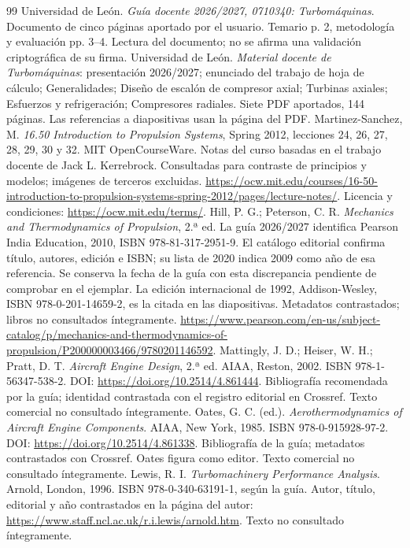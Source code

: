 \documentclass[10pt,openany]{book}
\begin{document}
\backmatter

\begin{thebibliography}{99}
 Universidad de León. \emph{Guía docente 2026/2027, 0710340: Turbomáquinas}. Documento de cinco páginas aportado por el usuario. Temario p. 2, metodología y evaluación pp. 3--4. Lectura del documento; no se afirma una validación criptográfica de su firma.
 Universidad de León. \emph{Material docente de Turbomáquinas}: presentación 2026/2027; enunciado del trabajo de hoja de cálculo; Generalidades; Diseño de escalón de compresor axial; Turbinas axiales; Esfuerzos y refrigeración; Compresores radiales. Siete PDF aportados, 144 páginas. Las referencias a diapositivas usan la página del PDF.
 Martinez-Sanchez, M. \emph{16.50 Introduction to Propulsion Systems}, Spring 2012, lecciones 24, 26, 27, 28, 29, 30 y 32. MIT OpenCourseWare. Notas del curso basadas en el trabajo docente de Jack L. Kerrebrock. Consultadas para contraste de principios y modelos; imágenes de terceros excluidas. \url{https://ocw.mit.edu/courses/16-50-introduction-to-propulsion-systems-spring-2012/pages/lecture-notes/}. Licencia y condiciones: \url{https://ocw.mit.edu/terms/}.
 Hill, P. G.; Peterson, C. R. \emph{Mechanics and Thermodynamics of Propulsion}, 2.ª ed. La guía 2026/2027 identifica Pearson India Education, 2010, ISBN 978-81-317-2951-9. El catálogo editorial confirma título, autores, edición e ISBN; su lista de 2020 indica 2009 como año de esa referencia. Se conserva la fecha de la guía con esta discrepancia pendiente de comprobar en el ejemplar. La edición internacional de 1992, Addison-Wesley, ISBN 978-0-201-14659-2, es la citada en las diapositivas. Metadatos contrastados; libros no consultados íntegramente. \url{https://www.pearson.com/en-us/subject-catalog/p/mechanics-and-thermodynamics-of-propulsion/P200000003466/9780201146592}.
 Mattingly, J. D.; Heiser, W. H.; Pratt, D. T. \emph{Aircraft Engine Design}, 2.ª ed. AIAA, Reston, 2002. ISBN 978-1-56347-538-2. DOI: \url{https://doi.org/10.2514/4.861444}. Bibliografía recomendada por la guía; identidad contrastada con el registro editorial en Crossref. Texto comercial no consultado íntegramente.
 Oates, G. C. (ed.). \emph{Aerothermodynamics of Aircraft Engine Components}. AIAA, New York, 1985. ISBN 978-0-915928-97-2. DOI: \url{https://doi.org/10.2514/4.861338}. Bibliografía de la guía; metadatos contrastados con Crossref. Oates figura como editor. Texto comercial no consultado íntegramente.
 Lewis, R. I. \emph{Turbomachinery Performance Analysis}. Arnold, London, 1996. ISBN 978-0-340-63191-1, según la guía. Autor, título, editorial y año contrastados en la página del autor: \url{https://www.staff.ncl.ac.uk/r.i.lewis/arnold.htm}. Texto no consultado íntegramente.

\end{thebibliography}
\end{document}
